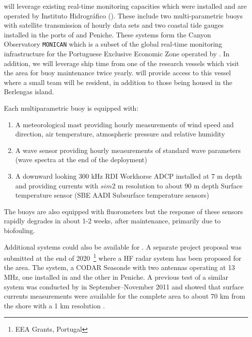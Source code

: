 \proj will leverage existing real-time monitoring capacities which were
installed and are operated by Instituto Hidrogr\'{a}fico (\inste). These
include two multi-parametric buoys with satellite transmission of hourly
data sets and two coastal tide gauges installed in the ports of \naz and
Peniche. These systems form the \naz Canyon Observatory \texttt{MONICAN}
which is a subset of the global real-time monitoring infrastructure for
the Portuguese Exclusive Economic Zone operated by \inst {}. In addition, we will leverage ship
time from one of the \inst research vessels which visit the \naz area
for buoy maintenance twice yearly. \inst will provide access to this
vessel where a small \proj team will be resident, in addition to those
being housed in the Berlengas island.

Each multiparametric buoy is equipped with:

\begin{enumerate}[noitemsep,topsep=0pt,parsep=0pt,partopsep=0pt]

  \item A meteorological mast providing hourly measurements of wind speed and
    direction, air temperature, atmospheric pressure and relative
    humidity

  \item A wave sensor providing hourly measurements of standard wave parameters
    (wave spectra at the end of the deployment)

  \item A downward looking 300 kHz RDI Workhorse ADCP installed at 7 m
    depth and providing currents with $sim 2$ m resolution to about 90 m
    depth Surface temperature sensor (SBE AADI Subsurface temperature
    sensors)

\end{enumerate}  


The buoys are also equipped with fluorometers but the response of these
sensors rapidly degrades in about 1-2 weeks, after maintenance,
primarily due to biofouling.

Additional systems could also be available for \proje. A separate
project proposal was submitted at the end of 2020~\footnote{EEA Grants,
  Portugal} where a HF radar system has been proposed for the \naz area.
The system, a CODAR Seasonde with two antennas operating at 13 MHz, one
installed in \naz and the other in Peniche. A previous test of a similar
system was conducted by \inst in September--November 2011 and showed
that surface currents measurements were available for the complete area
to about 70 km from the shore with a 1 km resolution .
 
